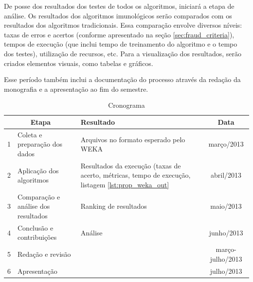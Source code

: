 De posse dos resultados dos testes de todos os algoritmos, iniciará a etapa de análise. Os resultados dos algoritmos imunológicos serão comparados com os resultados dos algoritmos tradicionais. Essa comparação envolve diversos níveis: taxas de erros e acertos (conforme apresentado na seção \ref{sec:fraud_criteria}), tempos de execução (que inclui tempo de treinamento do algoritmo e o tempo dos testes), utilização de recursos, etc. Para a visualização dos resultados, serão criados elementos visuais, como tabelas e gráficos.

Esse período também inclui a documentação do processo através da redação da monografia e a apresentação ao fim do semestre.

\begin{table}[h]
    \vspace{1cm}
    \caption{Cronograma}
    \centering
    \begin{tabular}{l >{\arraybackslash}m{4cm} >{\centering\arraybackslash}m{7cm} c}
        \multicolumn{2}{c}{Etapa} & Resultado & Data \\
        \hline
        1 & Coleta e preparação dos dados       & Arquivos no formato esperado pelo WEKA & março/2013 \\
        2 & Aplicação dos algoritmos            & Resultados da execução (taxas de acerto, métricas, tempo de execução, listagem \ref{lst:prop_weka_out} & abril/2013 \\
        3 & Comparação e análise dos resultados & Ranking de resultados & maio/2013 \\
        4 & Conclusão e contribuições           & Análise & junho/2013 \\
        5 & Redação e revisão                   & & março-julho/2013 \\
        6 & Apresentação                        & & julho/2013 \\
    \end{tabular}
    \label{tab:prop_cron}
    \vspace{1cm}
\end{table}
